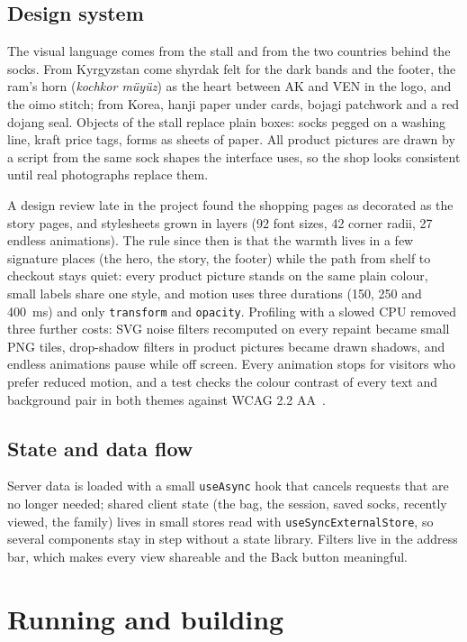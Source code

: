 \subsection{Design system}
\label{sec:design}

The visual language comes from the stall and from the two countries behind the socks. From Kyrgyzstan come shyrdak felt
for the dark bands and the footer, the ram's horn (\textit{kochkor müyüz}) as the heart between AK and VEN in the logo,
and the oimo stitch; from Korea, hanji paper under cards, bojagi patchwork and a red dojang seal. Objects of the stall
replace plain boxes: socks pegged on a washing line, kraft price tags, forms as sheets of paper. All product pictures
are drawn by a script from the same sock shapes the interface uses, so the shop looks consistent until real photographs
replace them.

A design review late in the project found the shopping pages as decorated as the story pages, and stylesheets grown in
layers (92 font sizes, 42 corner radii, 27 endless animations). The rule since then is that the warmth lives in a few
signature places (the hero, the story, the footer) while the path from shelf to checkout stays quiet: every product
picture stands on the same plain colour, small labels share one style, and motion uses three durations (150, 250 and
400~ms) and only \texttt{transform} and \texttt{opacity}. Profiling with a slowed CPU removed three further costs:
SVG noise filters recomputed on every repaint became small PNG tiles, drop-shadow filters in product pictures became
drawn shadows, and endless animations pause while off screen. Every animation stops for visitors who prefer reduced
motion, and a test checks the colour contrast of every text and background pair in both themes against WCAG 2.2
AA~\cite{wcag}.

\subsection{State and data flow}

Server data is loaded with a small \texttt{useAsync} hook that cancels requests that are no longer needed; shared
client state (the bag, the session, saved socks, recently viewed, the family) lives in small stores read with
\texttt{useSyncExternalStore}, so several components stay in step without a state library. Filters live in the address
bar, which makes every view shareable and the Back button meaningful.

\section{Running and building}
\label{sec:running}

